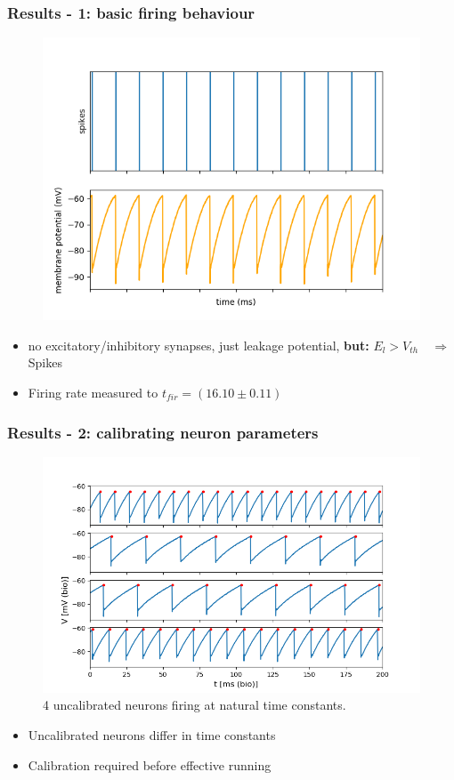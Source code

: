 \documentclass{beamer}
\begin{document}
\begin{frame}
    \frametitle{Results - 1: basic firing behaviour}
    \begin{figure}
    		\centering
    		\includegraphics[width=0.6\linewidth]{figures/fp_task1_1membrane.png}
    \end{figure}

    \begin{itemize}
    		\item no excitatory/inhibitory synapses,  just leakage potential,
    		\textbf{but: } $E_l>V_{th}\quad \Rightarrow$ Spikes
    		\item Firing rate measured to $t_{fir} = (16.10\pm 0.11)$
    \end{itemize}
\end{frame}

\begin{frame}
    \frametitle{Results - 2: calibrating neuron parameters}
    \begin{figure}
        \includegraphics[width=.7\textwidth]{figures/4membranes.png}
        \caption{4 uncalibrated neurons firing at natural time constants.}
    \end{figure}
    \begin{itemize}
        \item Uncalibrated neurons differ in time constants
        \item Calibration required before effective running
    \end{itemize}
\end{frame}
\end{document}
